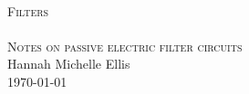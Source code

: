 \begin{titlepage}
\begin{center}
\HRule \\[0.5cm]
\textsc{\huge Filters}\\[0.5cm]
\HRule \\[0.5cm]
\textsc{\Large Notes on passive electric filter circuits}\\[0.5cm]
\vfill
Hannah Michelle Ellis\\[1.0cm]
\today
\end{center}
\end{titlepage}
